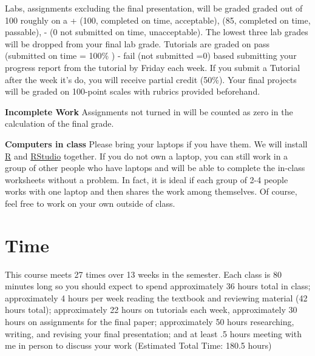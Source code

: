 Labs, assignments excluding the final presentation, will be graded graded out of 100 roughly on a \checkmark + (100, completed on time, acceptable), \checkmark (85, completed on time, passable), \checkmark - (0 not submitted on time, unacceptable). The lowest three lab grades will be dropped from your final lab grade. Tutorials are graded on pass (submitted on time = 100\% ) - fail (not submitted =0) based submitting your progress report from the tutorial by Friday each week. If you submit a Tutorial after the week it's do, you will receive partial credit (50\%). Your final projects will be graded on 100-point scales with rubrics provided beforehand.


\textbf{Incomplete Work} Assignments not turned in will be counted as zero in the calculation of the final grade.

\textbf{Computers in class} Please bring your laptops if you have them. We will install \href{https://cran.r-project.org/}{R} and \href{https://www.rstudio.com/products/RStudio/#Desktop}{RStudio} together. If you do not own a laptop, you can still work in a group of other people who have laptops and will be able to complete the in-class worksheets without a problem. In fact, it is ideal if each group of 2-4 people works with one laptop and then shares the work among themselves. Of course, feel free to work on your own outside of class. 

\section{Time}

This course meets 27 times over 13 weeks in the semester. Each class is 80 minutes long so you should expect to spend approximately 36 hours total in class; approximately 4 hours per week reading the textbook and reviewing material (42 hours total);  approximately 22 hours on tutorials each week, approximately 30 hours on assignments for the final paper; approximately 50 hours researching, writing, and revising your final presentation; and at least .5 hours meeting with me in person to discuss your work (Estimated Total Time: 180.5 hours)




